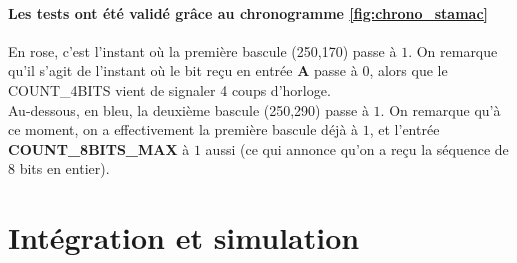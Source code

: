 \documentclass[a4paper]{article} %
\begin{document}
\begin{tcolorbox}[colframe=Monokaimagenta,colback=white]
\begin{figure}[H]
\label{fig:graphe_etat}
\end{figure}


\paragraph{Les tests ont été validé grâce au chronogramme \ref{fig:chrono_stamac}}
En rose, c'est l'instant où la première bascule (250,170) passe à $1$. On remarque qu'il s'agit de l'instant où le bit reçu en entrée \textbf{A} passe à $0$, alors que le COUNT\_4BITS vient de signaler 4 coups d'horloge.\\
Au-dessous, en bleu, la deuxième bascule (250,290) passe à $1$. On remarque qu'à ce moment, on a effectivement la première bascule déjà à $1$, et l'entrée \textbf{COUNT\_8BITS\_MAX} à $1$ aussi (ce qui annonce qu'on a reçu la séquence de 8 bits en entier).
\end{tcolorbox}
\pagebreak

\section {Intégration et simulation}
\end{document}
